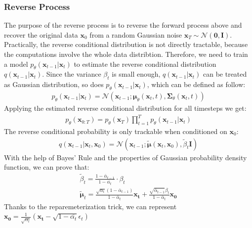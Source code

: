 \documentclass[12pt,DIV14,BCOR12mm,a4paper,footinclude=false,headinclude,parskip=half-,twoside,openright,cleardoublepage=empty,toc=index,bibliography=totoc,listof=totoc]{scrreprt}
\numberwithin{equation}{chapter}
\begin{document}
\subsubsection{Reverse Process}\label{sec:reverse}
The purpose of the reverse process is to reverse the forward process above and recover the original data $\mathbf{x}_{0}$ from a random Gaussian noise $\mathbf{x}_{T} \sim \mathcal{N}(\mathbf{0}, \mathbf{I})$. Practically, the reverse conditional distribution is not directly tractable, because the computations involve the whole data distribtion. Therefore, we need to train a model $p_{\theta}(\mathbf{x}_{t-1}|\mathbf{x}_{t})$ to estimate the reverse conditional distribution $q(\mathbf{x}_{t-1}|\mathbf{x}_{t})$. Since the variance $\beta_{t}$ is small enough, $q(\mathbf{x}_{t-1}|\mathbf{x}_{t})$ can be treated as Gaussian distribution, so does $p_{\theta}(\mathbf{x}_{t-1}|\mathbf{x}_{t})$, which can be defined as follow:
\begin{align}\label{eq:reverse}
  p_{\theta}(\mathbf{x}_{t-1}|\mathbf{x}_{t}) = \mathcal{N}(\mathbf{x}_{t-1}; \boldsymbol{\mu}_{\theta}(\mathbf{x}_{t},t), \mathbf{\Sigma}_{\theta}(\mathbf{x}_{t},t))
\end{align}
Applying the estimated reverse conditional distribution for all timesteps we get:
\begin{align}\label{eq:reverse_all}
  p_{\theta}(\mathbf{x}_{0:T}) = p_{\theta}(\mathbf{x}_{T})\prod_{t=1}^{T}p_{\theta}(\mathbf{x}_{t-1}|\mathbf{x}_{t})
\end{align}
The reverse conditional probability is only trackable when conditioned on $\mathbf{x}_{0}$:
\begin{align}\label{eq:reverse_q}
  q(\mathbf{x}_{t-1}|\mathbf{x}_{t},\mathbf{x}_{0}) = \mathcal{N} (\mathbf{x}_{t-1}; \boldsymbol{\tilde{\mu}}(\mathbf{x}_{t}, \mathbf{x}_{0}), \tilde{\beta}_{t}\mathbf{I})
\end{align}
With the help of Bayes' Rule and the properties of Gaussian probability density function, we can prove that:
\begin{gather}
  \tilde{\beta}_{t} = \frac{1-\bar{\alpha}_{t-1}}{1-\bar{\alpha_{t}}} \cdot  \beta_{t}\\
  \boldsymbol{\tilde{\mu}}_{t} = \frac{\sqrt{\alpha_{t}}(1-\bar{\alpha}_{t-1})}{1-\bar{\alpha}_{t}}\mathbf{x_{t}} + \frac{\sqrt{\bar{\alpha}_{t-1}}\beta_{t}}{1-\bar{\alpha}_{t}}\mathbf{x_{0}}
\end{gather}
Thanks to the reparemeterization trick, we can represent $\mathbf{x_{0}} = \frac{1}{\sqrt{\alpha_{t}}}(\mathbf{x_{t}} - \sqrt{1-\bar{\alpha_{t}}}\epsilon_{t})$ 
\end{document}

